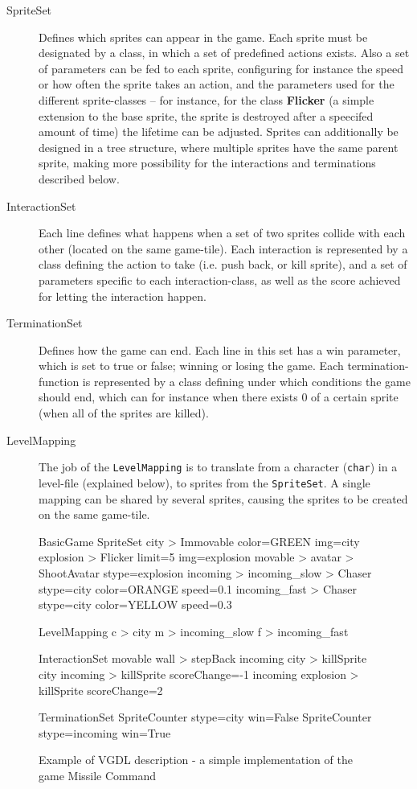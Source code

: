 \documentclass[a4paper,titlepage,final]{report}
\begin{document}
\begin{description}
\item [SpriteSet] Defines which sprites can appear in the game. Each sprite must be designated by a class, in which a set of predefined actions exists. Also a set of parameters can be fed to each sprite, configuring for instance the speed or how often the sprite takes an action, and the parameters used for the different sprite-classes -- for instance, for the  class \textbf{Flicker} (a simple extension to the base sprite, the sprite is destroyed after a speecifed amount of time) the lifetime can be adjusted.
Sprites can additionally be designed in a tree structure, where multiple sprites have the same parent sprite, making more possibility for the interactions and terminations described below. 
\item [InteractionSet] Each line defines what happens when a set of two sprites collide with each other (located on the same game-tile). Each interaction is represented by a class defining the action to take (i.e. push back, or kill sprite), and a set of parameters specific to each interaction-class, as well as the score achieved for letting the interaction happen.
\item [TerminationSet] Defines how the game can end. Each line in this set has a win parameter, which is set to true or false; winning or losing the game.
Each termination-function is represented by a class defining under which conditions the game should end, which can for instance when there exists 0 of a certain sprite (when all of the sprites are killed).
\item [LevelMapping] The job of the \texttt{LevelMapping} is to translate from a character (\texttt{char}) in a level-file (explained below), to sprites from the \texttt{SpriteSet}. 
A single mapping can be shared by several sprites, causing the sprites to be created on the same game-tile.
\end{description}



\begin{figure}[!ht]
\centering
\begin{vgdldesc}[linewidth=14cm]
BasicGame
	SpriteSet
		city  > Immovable color=GREEN img=city
		explosion > Flicker limit=5 img=explosion
		movable >
			avatar  > ShootAvatar stype=explosion
			incoming >
				incoming_slow  > Chaser stype=city color=ORANGE speed=0.1
				incoming_fast  > Chaser stype=city color=YELLOW speed=0.3

	LevelMapping
		c > city
		m > incoming_slow
		f > incoming_fast
		
	InteractionSet
		movable wall  > stepBack
		incoming city > killSprite
		city incoming > killSprite scoreChange=-1
		incoming explosion > killSprite scoreChange=2

	TerminationSet
		SpriteCounter stype=city   win=False
		SpriteCounter stype=incoming win=True
\end{vgdldesc}
\caption{Example of VGDL description - a simple implementation of the game Missile Command}
\label{fig:vgdl}
\end{figure}
\end{document}
